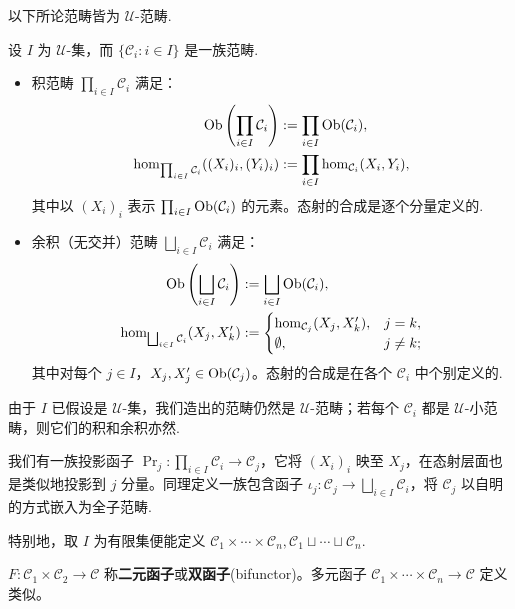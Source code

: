 以下所论范畴皆为 $\mathcal{U}$-范畴.

\begin{definition}
	设 $I$ 为 $\mathcal{U}$-集，而 $\{\mathcal{C}_i : i \in I \}$ 是一族范畴.
	\begin{itemize}
		\item 积范畴 $\prod_{i \in I} \mathcal{C}_i$ 满足：
			\begin{align*}
				\operatorname{Ob}\left( \prod_{i \in I} \mathcal{C}_i \right) & := \prod_{i \in I} \operatorname{Ob}(\mathcal{C}_i), \\
				\hom_{\prod_{i \in I} \mathcal{C}_i}( (X_i)_i, (Y_i)_i ) & := \prod_{i \in I} \hom_{\mathcal{C}_i}(X_i, Y_i),
			\end{align*}
			其中以 $(X_i)_i$ 表示 $\prod_{i \in I} \operatorname{Ob}(\mathcal{C}_i)$ 的元素。态射的合成是逐个分量定义的.
		\item 余积（无交并）范畴 $\bigsqcup_{i \in I} \mathcal{C}_i$ 满足：
			\begin{align*}
				\operatorname{Ob}\left( \bigsqcup_{i \in I} \mathcal{C}_i \right) & := \bigsqcup_{i \in I} \operatorname{Ob}(\mathcal{C}_i), \\
				\hom_{\bigsqcup_{i \in I} \mathcal{C}_i}(X_j, X'_k) & :=
				\begin{cases}
					\hom_{\mathcal{C}_j}(X_j, X'_k), & j = k, \\
					\emptyset, & j \neq k;
				\end{cases}
			\end{align*}
			其中对每个 $j \in I$，$X_j, X'_j \in \operatorname{Ob}(\mathcal{C}_j)$。态射的合成是在各个 $\mathcal{C}_i$ 中个别定义的.
	\end{itemize}
\end{definition}
由于 $I$ 已假设是 $\mathcal{U}$-集，我们造出的范畴仍然是 $\mathcal{U}$-范畴；若每个 $\mathcal{C}_i$ 都是 $\mathcal{U}$-小范畴，则它们的积和余积亦然.

我们有一族投影函子 $\Pr_j: \prod_{i \in I} \mathcal{C}_i \to \mathcal{C}_j$，它将 $(X_i)_i$ 映至 $X_j$，在态射层面也是类似地投影到 $j$ 分量。同理定义一族包含函子 $\iota_j: \mathcal{C}_j \to \bigsqcup_{i \in I} \mathcal{C}_i$，将 $\mathcal{C}_j$ 以自明的方式嵌入为全子范畴.

特别地，取 $I$ 为有限集便能定义 $\mathcal{C}_1 \times \cdots \times \mathcal{C}_n, \mathcal{C}_1 \sqcup \cdots \sqcup \mathcal{C}_n$.

\begin{definition}
	$F: \mathcal{C}_1 \times \mathcal{C}_2 \to \mathcal{C}$ 称\textbf{二元函子}或\textbf{双函子}(bifunctor)。多元函子 $\mathcal{C}_1 \times \cdots \times \mathcal{C}_n \to \mathcal{C}$ 定义类似。
\end{definition}

